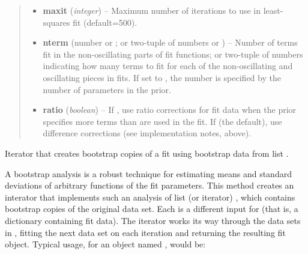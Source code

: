 \documentclass[letterpaper,10pt,english]{sphinxmanual}
\begin{document}
\begin{fulllineitems}
\begin{quote}
\begin{description}
\begin{itemize}
\item {} 
\textbf{maxit} (\emph{integer}) -- Maximum number of iterations to use in least-squares fit 
(default=500).

\item {} 
\textbf{nterm} (number or ; or two-tuple of numbers or ) -- Number of terms fit in the non-oscillating parts of fit 
functions; or two-tuple of numbers indicating how many terms to fit
for each of the non-oscillating and oscillating pieces in fits. If set
to , the number is specified by the number of parameters in
the prior.

\item {} 
\textbf{ratio} (\emph{boolean}) -- If , use ratio corrections for fit 
data when the prior specifies more terms than are used in the fit. If
 (the default), use difference corrections 
(see implementation notes, above).

\end{itemize}

\end{description}\end{quote}

\begin{fulllineitems}
\label{corrfitter:corrfitter.CorrFitter.bootstrap_iter}
Iterator that creates bootstrap copies of a {\hyperref[corrfitter:corrfitter.CorrFitter]{}} fit using 
bootstrap data from list .

A bootstrap analysis is a robust technique for estimating means and
standard deviations of arbitrary functions of the fit parameters.
This method creates an interator that implements such an analysis
of list (or iterator) , which contains bootstrap
copies of the original data set. Each  is a different
 input for  (that is, a dictionary containing
fit data). The iterator works its way through the data sets in
, fitting the next data set on each iteration and
returning the resulting  fit object. Typical
usage, for an {\hyperref[corrfitter:corrfitter.CorrFitter]{}} object named , would be:


\end{fulllineitems}
\end{fulllineitems}
\end{document}
